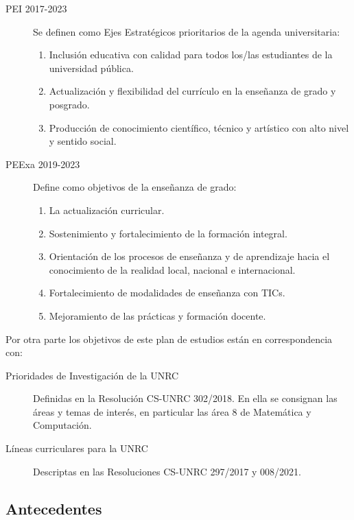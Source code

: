 \documentclass[a4paper, 12pt]{article}
\begin{document}
\begin{description}
\item[PEI 2017-2023] Se definen como Ejes Estratégicos prioritarios de la agenda universitaria:
\begin{enumerate}
 \item Inclusión    educativa    con    calidad    para         todos  los/las  estudiantes  de  la  universidad  pública.
 
 \item  Actualización  y  flexibilidad  del  currículo  en la enseñanza de grado y posgrado.
 
 \item Producción  de  conocimiento  científico,  técnico y artístico con alto nivel y sentido social. 
\end{enumerate}

\item[PEExa 2019-2023] Define como objetivos de la enseñanza de grado:
\begin{enumerate}
 \item  La actualización curricular.
 \item Sostenimiento y fortalecimiento de la formación integral.
\item Orientación de los procesos de enseñanza y de aprendizaje hacia el
conocimiento de la realidad local, nacional e internacional.
\item Fortalecimiento de modalidades de enseñanza con TICs.
\item Mejoramiento de las prácticas y formación docente.

\end{enumerate}

\end{description}

Por otra parte los objetivos de este plan de estudios están en correspondencia con:

\begin{description}
\item[Prioridades de Investigación de la UNRC] Definidas en la Resolución CS-UNRC 302/2018. 
En ella se consignan las áreas y temas de interés, en particular las área 8 de Matemática y Computación.
\item[Líneas curriculares para la UNRC] Descriptas en las Resoluciones CS-UNRC 297/2017 y 008/2021.
\end{description}




\subsection{Antecedentes}
\end{document}
